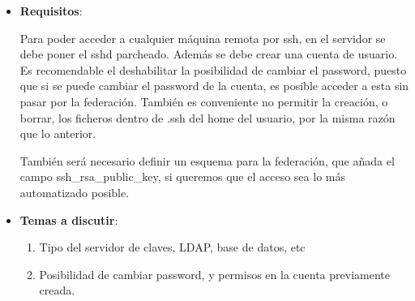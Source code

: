 \begin{itemize}
    \item \textbf{Requisitos}:

    Para poder acceder a cualquier máquina remota por ssh, en el servidor
    se debe poner el sshd parcheado. Además se debe crear una cuenta de
    usuario. Es recomendable el deshabilitar la posibilidad de cambiar el
    password, puesto que si se puede cambiar el password de la cuenta, es
    posible acceder a esta sin pasar por la federación. También es
    conveniente no permitir la creación, o borrar, los ficheros dentro de
    .ssh del home del usuario, por la misma razón que lo anterior.

    También será necesario definir un esquema para la federación, que añada
    el campo ssh\_rsa\_public\_key, si queremos que el acceso sea lo más
    automatizado posible.

    \item \textbf{Temas a discutir}:

    \begin{enumerate}
        \item Tipo del servidor de claves, LDAP, base de datos, etc

        \item Posibilidad de cambiar password, y permisos en la cuenta previamente creada.
    \end{enumerate}

    \end{itemize}

